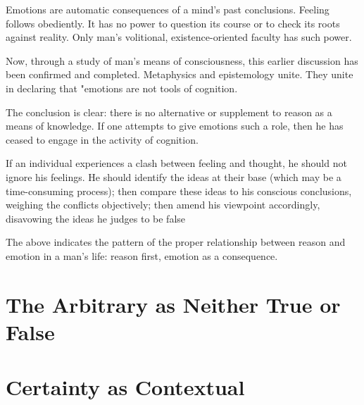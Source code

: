         Emotions are automatic consequences of a mind's past conclusions. Feeling follows obediently. It has no power to question its course or to check its roots against reality. Only man's volitional, existence-oriented faculty has such power.
        
        Now, through a study of man's means of consciousness, this earlier discussion has been confirmed and completed. Metaphysics and epistemology unite. They unite in declaring that "emotions are not tools of cognition.
        
        The conclusion is clear: there is no alternative or supplement to reason as a means of knowledge. If one attempts to give emotions such a role, then he has ceased to engage in the activity of cognition.
        
        If an individual experiences a clash between feeling and thought, he should not ignore his feelings. He should identify the ideas at their base (which may be a time-consuming process); then compare these ideas to his conscious conclusions, weighing the conflicts objectively; then amend his viewpoint accordingly, disavowing the ideas he judges to be false
        
        The above indicates the pattern of the proper relationship between reason and emotion in a man's life: reason first, emotion as a consequence.

    \section{The Arbitrary as Neither True or False}

    \section{Certainty as Contextual}